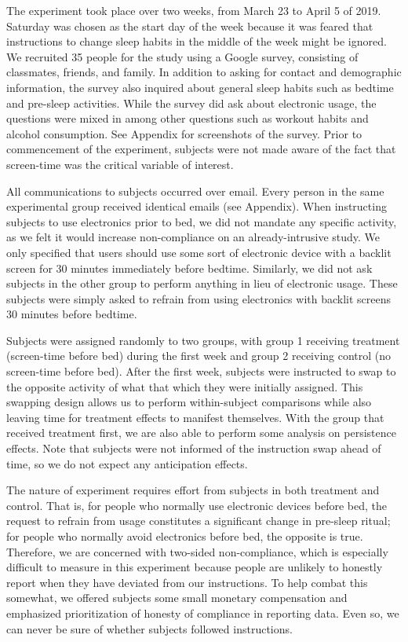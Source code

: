 \documentclass[12pt,]{article}
\begin{document}
The experiment took place over two weeks, from March 23 to April 5 of
2019. Saturday was chosen as the start day of the week because it was
feared that instructions to change sleep habits in the middle of the
week might be ignored. We recruited 35 people for the study using a
Google survey, consisting of classmates, friends, and family. In
addition to asking for contact and demographic information, the survey
also inquired about general sleep habits such as bedtime and pre-sleep
activities. While the survey did ask about electronic usage, the
questions were mixed in among other questions such as workout habits and
alcohol consumption. See Appendix for screenshots of the survey. Prior
to commencement of the experiment, subjects were not made aware of the
fact that screen-time was the critical variable of interest.

All communications to subjects occurred over email. Every person in the
same experimental group received identical emails (see Appendix). When
instructing subjects to use electronics prior to bed, we did not mandate
any specific activity, as we felt it would increase non-compliance on an
already-intrusive study. We only specified that users should use some
sort of electronic device with a backlit screen for 30 minutes
immediately before bedtime. Similarly, we did not ask subjects in the
other group to perform anything in lieu of electronic usage. These
subjects were simply asked to refrain from using electronics with
backlit screens 30 minutes before bedtime.

Subjects were assigned randomly to two groups, with group 1 receiving
treatment (screen-time before bed) during the first week and group 2
receiving control (no screen-time before bed). After the first week,
subjects were instructed to swap to the opposite activity of what that
which they were initially assigned. This swapping design allows us to
perform within-subject comparisons while also leaving time for treatment
effects to manifest themselves. With the group that received treatment
first, we are also able to perform some analysis on persistence effects.
Note that subjects were not informed of the instruction swap ahead of
time, so we do not expect any anticipation effects.

The nature of experiment requires effort from subjects in both treatment
and control. That is, for people who normally use electronic devices
before bed, the request to refrain from usage constitutes a significant
change in pre-sleep ritual; for people who normally avoid electronics
before bed, the opposite is true. Therefore, we are concerned with
two-sided non-compliance, which is especially difficult to measure in
this experiment because people are unlikely to honestly report when they
have deviated from our instructions. To help combat this somewhat, we
offered subjects some small monetary compensation and emphasized
prioritization of honesty of compliance in reporting data. Even so, we
can never be sure of whether subjects followed instructions.
\end{document}
